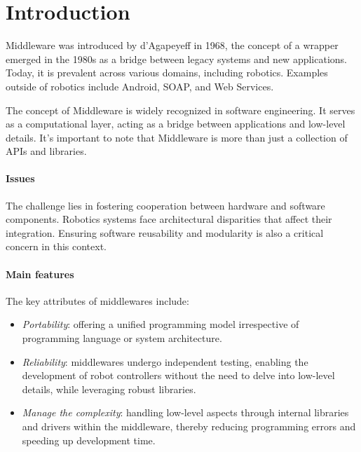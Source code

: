 \section{Introduction}

Middleware was introduced by d'Agapeyeff in 1968, the concept of a wrapper emerged in the 1980s as a bridge between legacy systems and new applications. 
Today, it is prevalent across various domains, including robotics. 
Examples outside of robotics include Android, SOAP, and Web Services.

The concept of Middleware is widely recognized in software engineering. 
It serves as a computational layer, acting as a bridge between applications and low-level details. 
It's important to note that Middleware is more than just a collection of APIs and libraries.

\paragraph*{Issues}
The challenge lies in fostering cooperation between hardware and software components. 
Robotics systems face architectural disparities that affect their integration. 
Ensuring software reusability and modularity is also a critical concern in this context.

\paragraph*{Main features}
The key attributes of middlewares include:
\begin{itemize}
    \item \textit{Portability}: offering a unified programming model irrespective of programming language or system architecture.
    \item \textit{Reliability}: middlewares undergo independent testing, enabling the development of robot controllers without the need to delve into low-level details, while leveraging robust libraries.
    \item \textit{Manage the complexity}: handling low-level aspects through internal libraries and drivers within the middleware, thereby reducing programming errors and speeding up development time.
\end{itemize}

